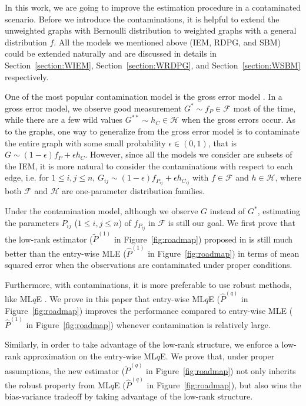 \documentclass[a4paper]{article}
\renewcommand{\hat}{\widehat}
\begin{document}
In this work, we are going to improve the estimation procedure in a contaminated scenario. Before we introduce the contaminations, it is helpful to extend the unweighted graphs with Bernoulli distribution to weighted graphs with a general distribution $f$. All the models we mentioned above (IEM, RDPG, and SBM) could be extended naturally and are discussed in details in Section~\ref{section:WIEM}, Section~\ref{section:WRDPG}, and Section~\ref{section:WSBM} respectively.

One of the most popular contamination model is the gross error model \citep{AIC:AIC690280519, bickel2001mathematical}. In a gross error model, we observe good measurement $G^* \sim f_P \in \mathcal{F}$ most of the time, while there are a few wild values $G^{**} \sim h_C \in \mathcal{H}$ when the gross errors occur.
As to the graphs, one way to generalize from the gross error model is to contaminate the entire graph with some small probability $\epsilon \in (0, 1)$, that is $G \sim (1-\epsilon) f_P + \epsilon h_C$. However, since all the models we consider are subsets of the IEM, it is more natural to consider the contaminations with respect to each edge, i.e. for $1 \le i, j \le n$, $G_{ij} \sim (1-\epsilon) f_{P_{ij}} + \epsilon h_{C_{ij}}$ with $f \in \mathcal{F}$ and $h \in \mathcal{H}$, where both $\mathcal{F}$ and $\mathcal{H}$ are one-parameter distribution families.

Under the contamination model, although we observe $G$ instead of $G^*$, estimating the parameters $P_{ij}$ ($1 \le i, j \le n$) of $f_{P_{ij}}$ in $\mathcal{F}$ is still our goal. We first prove that the low-rank estimator ($\widetilde{P}^{(1)}$ in Figure~\ref{fig:roadmap}) proposed in \citep{tang2016law} is still much better than the entry-wise MLE ($\hat{P}^{(1)}$ in Figure~\ref{fig:roadmap}) in terms of mean squared error when the observations are contaminated under proper conditions.

Furthermore, with contaminations, it is more preferable to use robust methods, like ML$q$E \citep{ferrari2010, qin2013maximum}. We prove in this paper that entry-wise ML$q$E ($\hat{P}^{(q)}$ in Figure~\ref{fig:roadmap}) improves the performance compared to entry-wise MLE ($\hat{P}^{(1)}$ in Figure~\ref{fig:roadmap}) whenever contamination is relatively large.

Similarly, in order to take advantage of the low-rank structure, we enforce a low-rank approximation on the entry-wise ML$q$E. We prove that, under proper assumptions, the new estimator ($\widetilde{P}^{(q)}$ in Figure~\ref{fig:roadmap}) not only inherits the robust property from ML$q$E ($\hat{P}^{(q)}$ in Figure~\ref{fig:roadmap}), but also wins the bias-variance tradeoff by taking advantage of the low-rank structure.
\end{document}
